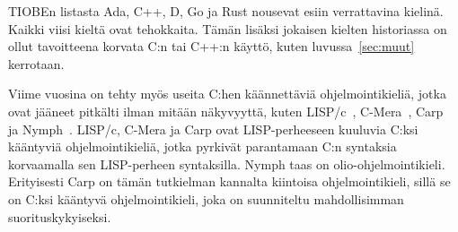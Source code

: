 TIOBEn listasta Ada, C++, D, Go ja Rust nousevat esiin verrattavina kielinä.
Kaikki viisi kieltä ovat tehokkaita. Tämän lisäksi jokaisen kielten historiassa
on ollut tavoitteena korvata C:n tai C++:n käyttö, kuten luvussa~\ref{sec:muut}
kerrotaan.

Viime vuosina on tehty myös useita C:hen käännettäviä ohjelmointikieliä, jotka
ovat jääneet pitkälti ilman mitään näkyvyyttä, kuten LISP/c~\citep{clisp1},
C-Mera~\citep{clisp2}, Carp~\citep{clisp3} ja Nymph~\citep{nymph}. LISP/c,
C-Mera ja Carp ovat LISP-perheeseen kuuluvia C:ksi kääntyviä ohjelmointikieliä,
jotka pyrkivät parantamaan C:n syntaksia korvaamalla sen LISP-perheen
syntaksilla. Nymph taas on olio-ohjelmointikieli. Erityisesti Carp on tämän
tutkielman kannalta kiintoisa ohjelmointikieli, sillä se on C:ksi kääntyvä
ohjelmointikieli, joka on suunniteltu mahdollisimman suorituskykyiseksi.

